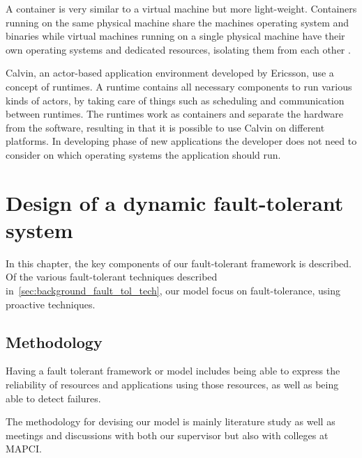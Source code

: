 \documentclass{cslthse-msc}
\begin{document}
A container is very similar to a virtual machine but more light-weight. Containers running on the same physical machine share the machines operating system and binaries while virtual machines running on a single physical machine have their own operating systems and dedicated resources, isolating them from each other \cite{vm_vs_container}.

Calvin, an actor-based application environment developed by Ericsson, use a concept of runtimes. A runtime contains all necessary components to run various kinds of actors, by taking care of things such as scheduling and communication between runtimes. The runtimes work as containers and separate the hardware from the software, resulting in that it is possible to use Calvin on different platforms. In developing phase of new applications the developer does not need to consider on which operating systems the application should run.

\chapter{Design of a dynamic fault-tolerant system} \label{ch:design}
In this chapter, the key components of our fault-tolerant framework is described. Of the various fault-tolerant techniques described in~\ref{sec:background_fault_tol_tech}, our model focus on fault-tolerance, using proactive techniques.

\section{Methodology} \label{sec:design_methodology}
Having a fault tolerant framework or model includes being able to express the reliability of resources and applications using those resources, as well as being able to detect failures. 

The methodology for devising our model is mainly literature study as well as meetings and discussions with both our supervisor but also with colleges at MAPCI.
\end{document}
